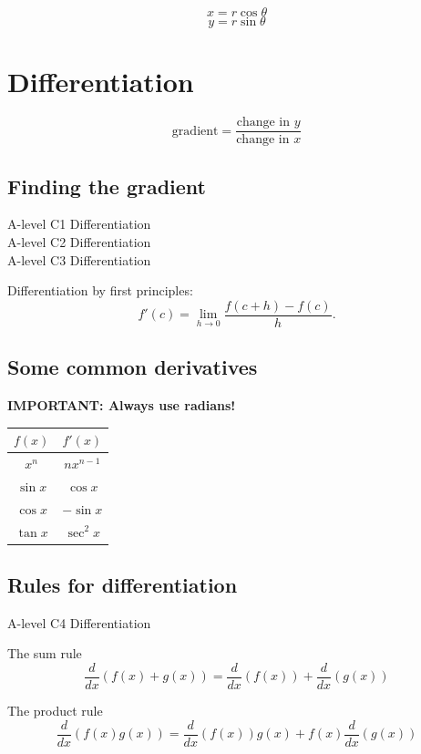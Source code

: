 \documentclass[11pt,a4paper,oneside]{book}
\begin{document}
\begin{in_a_box}
$$x=r\cos\theta$$
$$y=r\sin\theta$$
\end{in_a_box}

\chapter{Differentiation}
$$\text{gradient}=\frac{\text{change in }y}{\text{change in }x}$$

\section{Finding the gradient}
\begin{gce}
A-level C1 Differentiation\\
A-level C2 Differentiation\\
A-level C3 Differentiation
\end{gce}
\begin{definition}
Differentiation by first principles:
$$f'(c)=\lim_{h\rightarrow 0}\frac{f(c+h)-f(c)}{h}.$$
\end{definition}

\section{Some common derivatives}

\textbf{IMPORTANT: Always use radians!}

\begin{tabular}{|c | c|}
\hline
$f(x)$&$f'(x)$\\\hline
$x^n$&$nx^{n-1}$\\
$\sin x$&$\cos x$\\
$\cos x$&$-\sin x$\\
$\tan x$&$\sec^2 x$\\
\hline
\end{tabular}
\section{Rules for differentiation}
\begin{gce}
A-level C4 Differentiation
\end{gce}
\begin{thing}{The sum rule}
\[\frac{d}{dx}\left( f(x)+g(x)\right)=\frac{d}{dx}\left(f(x)\right)+\frac{d}{dx}\left(g(x)\right)\]
\end{thing}

\begin{thing}{The product rule}
\[\frac{d}{dx}\left( f(x)g(x) \right) = \frac{d}{dx}\left(f(x)\right)g(x) + f(x)\frac{d}{dx}\left(g(x)\right)\]
\end{thing}
\end{document}
